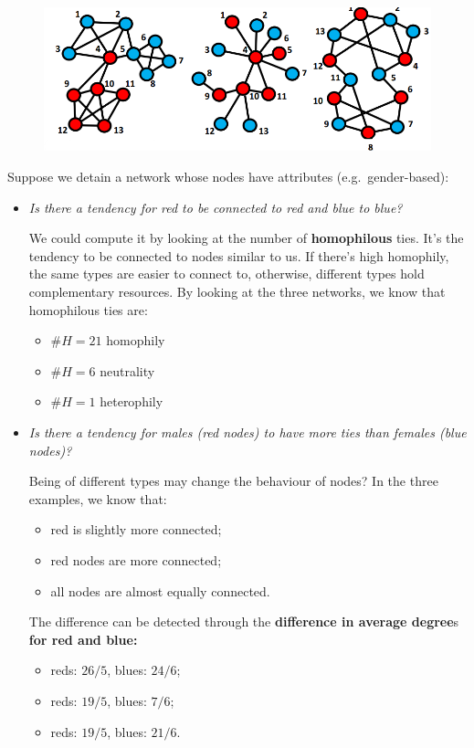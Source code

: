 \documentclass[
  notitlepage,
  onecolumn,
  openany]{book}
\providecommand{\tightlist}{%
  \setlength{\itemsep}{0pt}\setlength{\parskip}{0pt}}
\begin{document}
\begin{figure}[h!]

{\centering \includegraphics[width=0.5\linewidth]{images/13-ERGMs/Untitled 2} 

}

\end{figure}

Suppose we detain a network whose nodes have attributes (e.g.~gender-based):

\begin{itemize}
\item
  \emph{Is there a tendency for red to be connected to red and blue to blue?}

  We could compute it by looking at the number of \textbf{homophilous} ties. It's the tendency to be connected to nodes similar to us. If there's high homophily, the same types are easier to connect to, otherwise, different types hold complementary resources. By looking at the three networks, we know that homophilous ties are:

  \begin{itemize}
  \tightlist
  \item
    \(\# H = 21\) homophily
  \item
    \(\# H = 6\) neutrality
  \item
    \(\# H = 1\) heterophily
  \end{itemize}
\item
  \emph{Is there a tendency for males (red nodes) to have more ties than females (blue nodes)?}

  Being of different types may change the behaviour of nodes? In the three examples, we know that:

  \begin{itemize}
  \tightlist
  \item
    red is slightly more connected;
  \item
    red nodes are more connected;
  \item
    all nodes are almost equally connected.
  \end{itemize}

  The difference can be detected through the \textbf{difference in average degree}s \textbf{for red and blue:}

  \begin{itemize}
  \tightlist
  \item
    reds: \(26/5\), blues: \(24/6\);
  \item
    reds: \(19/5\), blues: \(7/6\);
  \item
    reds: \(19/5\), blues: \(21/6\).
  \end{itemize}
\end{itemize}
\end{document}

